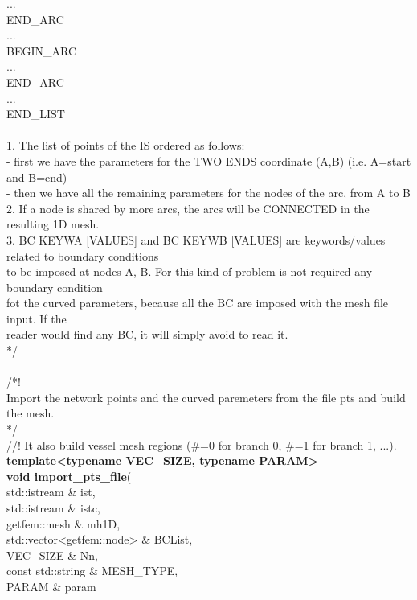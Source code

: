 \documentclass[a4paper]{report}
\newcommand\tab[1][1cm]{\hspace*{#1}}
\begin{document}
{\tab		... \\
\tab		END\_\-ARC \\
\tab		... \\
\tab		BEGIN\_\-ARC  \\
\tab		... \\
\tab		END\_\-ARC \\
\tab		... \\
\tab		END\_\-LIST \\
\\
  1. The list of points of the IS ordered as follows:\\
\tab     - first we have the parameters for the TWO ENDS coordinate (A,B) (i.e. A=start and B=end)\\
\tab     - then we have all the remaining parameters for the nodes of the arc, from A to B\\
  2. If a node is shared by more arcs, the arcs will be CONNECTED in the resulting 1D mesh.\\
  3. BC KEYWA [VALUES] and BC KEYWB [VALUES] are keywords/values related to boundary conditions\\
     to be imposed at nodes A, B. For this kind of problem is not required any boundary condition\\
     fot the curved parameters, because all the BC are imposed with the mesh file input. If the \\
     reader would find any BC, it will simply avoid to read it.\\
*/\\ \\
/*!\\
\tab	Import the network points and the curved paremeters from the file pts and build the
	mesh.\\
 */\\
//! It also build vessel mesh regions (\#=0 for branch 0, \#=1 for branch 1, ...).\\
\textbf{
template<typename VEC\_\-SIZE, typename PARAM>\\
void import\_\-pts\_\-file}(\\
\tab		std::istream \& ist, \\
\tab		std::istream \& istc,\\
\tab		getfem::mesh \& mh1D, \\
\tab		std::vector<getfem::node> \&  BCList,\\
\tab		VEC\_\-SIZE \& Nn,\\
\tab		const std::string \& MESH\_\-TYPE,\\
\tab		PARAM \& param\\
}
\end{document}
